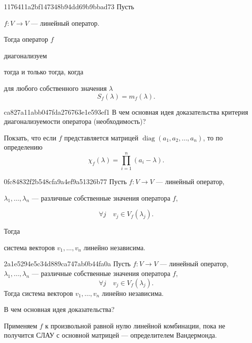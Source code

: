 \begin{note}{1176411a2bf147348b94dd69b9bbad73}
    Пусть \begin{icloze}{4}\( f : V \to V \) --- линейный оператор.\end{icloze} Тогда оператор \( f \) \begin{icloze}{2}диагонализуем\end{icloze} \begin{icloze}{3}тогда и только тогда, когда\end{icloze} \begin{icloze}{1}для любого собственного значения \( \lambda \)
    \[
        S_f(\lambda) = m_f(\lambda).
    \]\end{icloze}
\end{note}

\begin{note}{ca827a11abb047fda276763e1e593ef1}
    В чем основная идея доказательства критерия диагонализуемости оператора (необходимость)?

    \begin{cloze}{1}
        Покзать, что если \( f \) представляется матрицей \( \operatorname{diag} (a_1, a_2, \ldots, a_n) \), то по определению
        \[
            \chi_f (\lambda) = \prod_{i = 1}^{n} (a_i - \lambda).
        \]
    \end{cloze}
\end{note}

\begin{note}{0fc84832f2b548cfa9a4ef9a51326b77}
    Пусть \( f : V \to V \) --- линейный оператор, \begin{icloze}{3}\( \lambda_1, \ldots, \lambda_n \) --- различные собственные значения оператора \( f \),\end{icloze} \begin{icloze}{2}
        \[
            \forall j \quad v_j \in V_f (\lambda_j).
        \]
    \end{icloze}
    Тогда \begin{icloze}{1}система векторов \( v_1, \ldots, v_n \) линейно независима.\end{icloze}
\end{note}

\begin{note}{2a1e5294e5c34d889ca747ab0b44fa0a}
    Пусть \( f : V \to V \) --- линейный оператор, \( \lambda_1, \ldots, \lambda_n \) --- различные собственные значения оператора \( f \),
    \[
        \forall j \quad v_j \in V_f (\lambda_j).
    \]
    Тогда система векторов \( v_1, \ldots, v_n \) линейно независима.

    В чем основная идея доказательства?

    \begin{cloze}{1}
         Применяем \( f \) к произвольной равной нулю линейной комбинации, пока не получится СЛАУ с основной матрицей --- определителем Вандермонда.
    \end{cloze}
\end{note}

